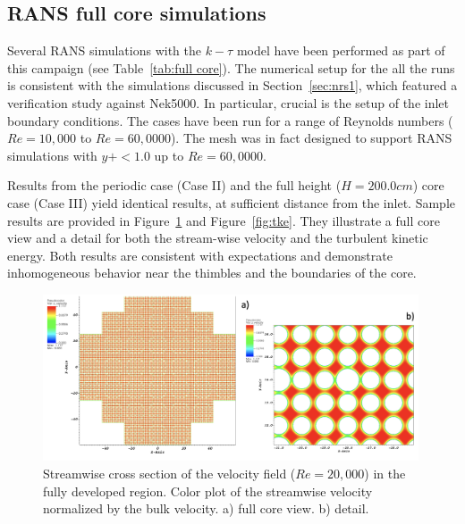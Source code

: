 \subsection{RANS full core simulations}
\label{sec:results2}

Several RANS simulations with the $k-\tau$ model have been performed as part of this campaign (see Table~\ref{tab:full core}). The numerical setup for the all the runs is consistent with the simulations discussed in Section~\ref{sec:nrs1}, which featured a verification study against Nek5000. In particular, crucial is the setup of the inlet boundary conditions. The cases have been run for a range of Reynolds numbers ($Re=10,000$ to $Re=60,0000$). The mesh was in fact  designed to support RANS simulations with $y+<1.0$ up to $Re=60,0000$.

Results from the periodic case (Case II) and the full height ($H=200.0 cm$) core case (Case III) yield identical results, at sufficient distance from the inlet. Sample results are provided in Figure~\ref{fig:vz} and Figure~\ref{fig:tke}. They illustrate a full core view and a detail for both the stream-wise velocity and the turbulent kinetic energy.  Both results are consistent with expectations and demonstrate inhomogeneous behavior near the thimbles and the boundaries of the core.

\begin{figure}[!ht]
\centering
\includegraphics[width=0.99\textwidth]{./figures/periodic_vz.png}
\caption{Streamwise cross section of the velocity field ($Re=20,000$) in the fully developed region. Color plot of the streamwise velocity normalized by the bulk velocity. a) full core view. b) detail.}
\label{fig:vz}
\end{figure}

